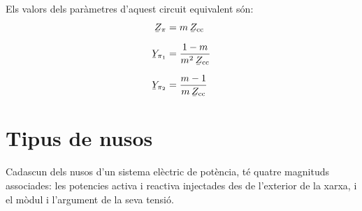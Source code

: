 Els valors dels par\`{a}metres d'aquest circuit equivalent s\'{o}n:
\begin{align}
   \cmplx{Z}_\pi &= m \, \cmplx{Z}\ped{cc} \\[1.5ex]
   \cmplx{Y}_{\pi_1} &= \frac{1-m}{m^2 \,\cmplx{Z}\ped{cc}} \\[1.5ex]
   \cmplx{Y}_{\pi_2} &= \frac{m-1}{m\, \cmplx{Z}\ped{cc}}
\end{align}

\break
\section{Tipus de nusos} 

Cadascun dels nusos d'un sistema el\`{e}ctric de pot\`{e}ncia, t\'{e} quatre
magnituds associades: les potencies activa i reactiva injectades des
de l'exterior de la xarxa, i el m\`{o}dul i l'argument de la seva
tensi\'{o}.

